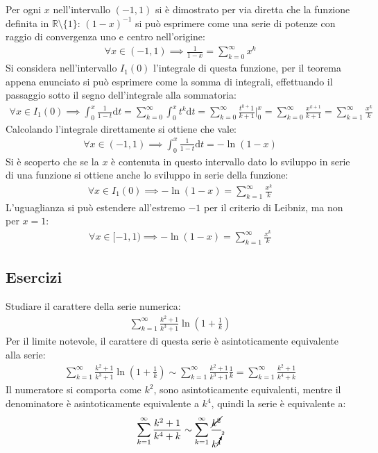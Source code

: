\documentclass{article}
\numberwithin{equation}{subsection}
\begin{document}
Per ogni $x$ nell'intervallo $(-1,1)$ si è dimostrato per via diretta che la funzione definita in $\mathbb{R}\setminus\{1\}$: $(1-x)^{-1}$ si può esprimere come una serie di potenze con raggio di convergenza uno e centro nell'origine:
\begin{gather*}
    \forall x\in(-1,1)\implies\displaystyle\frac{1}{1-x}=\sum_{k=0}^\infty x^k
\end{gather*}
Si considera nell'intervallo $I_1(0)$ l'integrale di questa funzione, per il teorema appena enunciato si può esprimere come la somma di integrali, effettuando il passaggio sotto il segno dell'integrale alla sommatoria: %
\begin{gather*}
    \forall x \in I_1(0)\implies\displaystyle\int_{0}^x\frac{1}{1-t}\mathrm{d}t=
    \sum_{k=0}^\infty\int_{0}^x t^k\mathrm{d}t=
    \sum_{k=0}^\infty\frac{t^{k+}1}{k+1}\bigg|_{0}^x=
    \sum_{k=0}^\infty\frac{x^{k+1}}{k+1}=\sum_{k=1}^\infty\frac{x^k}{k}
\end{gather*}
Calcolando l'integrale direttamente si ottiene che vale:
\begin{gather*}
    \forall x\in(-1,1)\implies\displaystyle\int_0^x\frac{1}{1-t}\mathrm{d}t=-\ln(1-x)
\end{gather*}
Si è scoperto che se la $x$ è contenuta in questo intervallo dato lo sviluppo in serie di una funzione si ottiene anche lo sviluppo in serie della funzione:
\begin{gather*}
    \forall x\in I_1(0)\implies -\ln(1-x)=\displaystyle\sum_{k=1}^\infty\frac{x^k}{k}
\end{gather*}
L'uguaglianza si può estendere all'estremo $-1$ per il criterio di Leibniz, ma non per $x=1$:
\begin{gather*}
    \forall x\in [-1,1)\implies -\ln(1-x)=\displaystyle\sum_{k=1}^\infty\frac{x^k}{k}
\end{gather*}


\subsection{Esercizi}

Studiare il carattere della serie numerica:
\begin{gather*}
    \displaystyle\sum_{k=1}^\infty\frac{k^2+1}{k^3+1}\ln\left(1+\frac{1}{k}\right)
\end{gather*}
Per il limite notevole, il carattere di questa serie è asintoticamente equivalente alla serie:
\begin{gather*}
    \displaystyle\sum_{k=1}^\infty\frac{k^2+1}{k^3+1}\ln\left(1+\frac{1}{k}\right)\sim
    \displaystyle\sum_{k=1}^\infty\frac{k^2+1}{k^3+1}\frac{1}{k}=
    \displaystyle\sum_{k=1}^\infty\frac{k^2+1}{k^4+k}
\end{gather*}
Il numeratore si comporta come $k^2$, sono asintoticamente equivalenti, mentre il denominatore è asintoticamente equivalente a $k^4$, quindi la serie è equivalente a:
\begin{gather*}
    \displaystyle\sum_{k=1}^\infty\frac{k^2+1}{k^4+k}\sim
    \displaystyle\sum_{k=1}^\infty\frac{\cancel{k^2}}{k^{\cancelto{2}{4}}}
\end{gather*}
\end{document}

